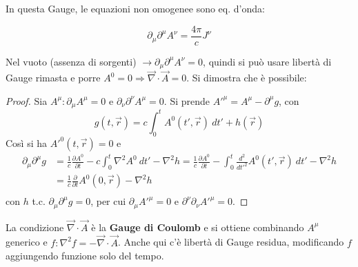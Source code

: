 \documentclass[10pt, a4paper]{scrartcl}
\numberwithin{equation}{subsection}
\theoremstyle{style1}
\newenvironment{boxenv}[1][]{
    \begin{eqbox}[#1]
    }{
   \end{eqbox}
}
\begin{document}
In questa Gauge, le equazioni non omogenee sono eq. d'onda:
\begin{boxenv}[]
\begin{equation}
	\partial _\mu  \partial ^\mu  A^\nu = \frac{4\pi }{c} J^\nu
\end{equation}
\end{boxenv}
\noindent Nel vuoto (assenza di sorgenti) $\to \partial _\mu  \partial ^\mu  A^\nu  = 0$, quindi si pu\`o usare libert\`a di Gauge rimasta e porre $A^0 = 0 \Rightarrow \vec{\nabla }\cdot \vec{A}=0$. Si dimostra che \`e possibile:
\begin{proof}
	Sia $A^\mu : \partial _\mu A^\mu =0$ e $\partial _\nu \partial ^\nu A^\mu = 0$. Si prende $A'^\mu  = A^\mu - \partial ^\mu g$, con
	\[
	g(t,\vec{r}) = c \int_{0} ^t A^0 (t',\vec{r}) \ dt' + h(\vec{r})
	\] 
	Cos\`i si ha $A'^0 (t,\vec{r}) = 0$ e 
	\[
	\begin{split}
		\partial _\mu  \partial ^\mu  g &= \frac{1}{c}\frac{\partial A^0 }{\partial  t} - c \int_{0} ^t \nabla ^2 A^0 \ dt' - \nabla ^2 h=\frac{1}{c}\frac{\partial A^0 }{\partial t} - \int_{0} ^t \frac{d ^2}{d t'^2} A^0(t',\vec{r}) \ dt' - \nabla ^2 h\\
						&= \frac{1}{c}\frac{\partial }{\partial t} A^0(0,\vec{r}) - \nabla ^2 h\\
	\end{split}
	\] 
	con $h$ t.c. $\partial _\mu \partial ^\mu g = 0$, per cui $\partial _\mu A'^\mu = 0 $ e $\partial ^\nu\partial _\nu A'^\mu =0$.
\end{proof}
\noindent La condizione $\vec{\nabla }\cdot \vec{A}$ \`e la \textbf{Gauge di Coulomb} e si ottiene combinando $A^\mu $ generico e $f: \nabla ^2 f = - \vec{\nabla }\cdot \vec{A}$. Anche qui c'\`e libert\`a di Gauge residua, modificando $f$ aggiungendo funzione solo del tempo.
\end{document}
